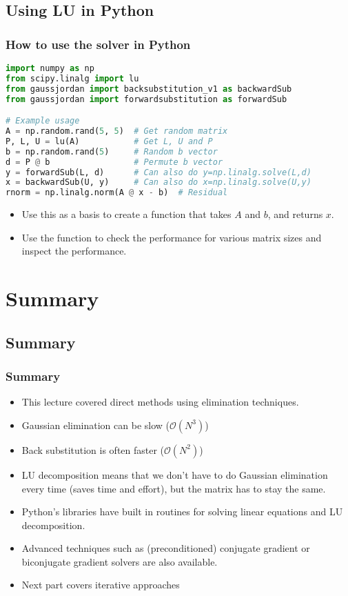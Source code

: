 \subsection*{Using LU in Python}
\begin{frame}[fragile]
  \frametitle{How to use the solver in Python}
  \begin{lstlisting}[language=Python]
import numpy as np
from scipy.linalg import lu
from gaussjordan import backsubstitution_v1 as backwardSub
from gaussjordan import forwardsubstitution as forwardSub

# Example usage
A = np.random.rand(5, 5)  # Get random matrix
P, L, U = lu(A)           # Get L, U and P
b = np.random.rand(5)     # Random b vector
d = P @ b                 # Permute b vector
y = forwardSub(L, d)      # Can also do y=np.linalg.solve(L,d)
x = backwardSub(U, y)     # Can also do x=np.linalg.solve(U,y)
rnorm = np.linalg.norm(A @ x - b)  # Residual
  \end{lstlisting}
  \pause
  \begin{itemize}
     \item Use this as a basis to create a function that takes $A$ and $b$, and returns $x$.
     \item Use the function to check the performance for various matrix sizes and inspect the performance.
  \end{itemize}

\end{frame}
\section{Summary}
\subsection*{Summary}

\begin{frame}[fragile]
  \frametitle{Summary}
  \begin{itemize}
    \item This lecture covered direct methods using elimination techniques.
    \item Gaussian elimination can be slow ($\mathcal{O}(N^3)$)
    \item Back substitution is often faster ($\mathcal{O}(N^2)$)
    \item LU decomposition means that we don't have to do Gaussian elimination every time (saves time and effort), but the matrix has to stay the same.
    \item Python's libraries have built in routines for solving linear equations and LU decomposition.
    \item Advanced techniques such as (preconditioned) conjugate gradient or biconjugate gradient solvers are also available.
    \item Next part covers iterative approaches
\end{itemize}
\end{frame}
